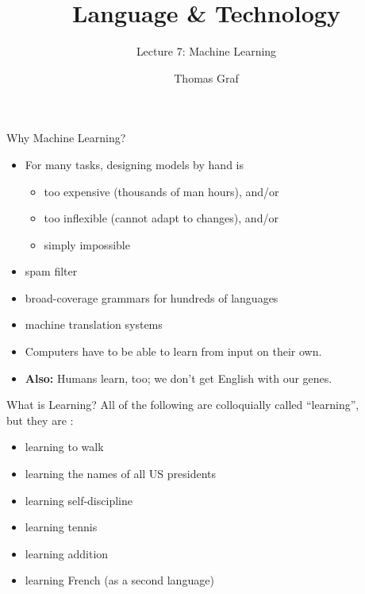 \documentclass[xcolor={usenames,svgnames,x11names,dvipsnames,table}]{beamer}
\title{\texorpdfstring{Language \& Technology}{Language and Technology}}
\subtitle{Lecture 7: Machine Learning}
\author{Thomas Graf}
\institute{Stony Brook University\\\texttt{lin120@thomasgraf.net}}
\date{}
\begin{document}
\unnumbered{
\begin{frame}
	\titlepage
\end{frame}
}

\begin{frame}{Why Machine Learning?}
    \begin{itemize}
        \item For many tasks, designing models by hand is
            \begin{itemize}
                \item too expensive (thousands of man hours), and\slash or
                \item too inflexible (cannot adapt to changes), and\slash or
                \item simply impossible
            \end{itemize}
    \end{itemize}

    \begin{example}
        \begin{itemize}
            \item spam filter
            \item broad-coverage grammars for hundreds of languages
            \item machine translation systems
        \end{itemize}
    \end{example}

    \begin{itemize}
        \item Computers have to be able to learn from input on their own.
        \item \textbf{Also:} Humans learn, too; we don't get English with our genes.
    \end{itemize}
\end{frame}

\begin{frame}{What is Learning?}
    All of the following are colloquially called ``learning'',\\
    but they are :
    \begin{itemize}
        \item learning to walk
        \item learning the names of all US presidents
        \item learning self-discipline
        \item learning tennis
        \item learning addition
        \item learning French (as a second language)
    \end{itemize}
\end{frame}
\end{document}
